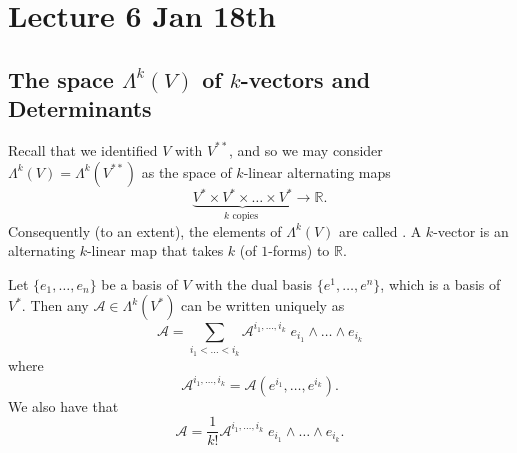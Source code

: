 \documentclass[notoc,notitlepage]{tufte-book}
\begin{document}



\chapter{Lecture 6 Jan 18th}%
\label{chp:lecture_6_jan_18th}

\section{The space \texorpdfstring{$\Lambda^k(V)$}{Lambda k(V)} of \texorpdfstring{$k$}{k}-vectors and Determinants}%
\label{sec:the_space_lambda_k_v_of_k_vectors_and_determinants}

Recall that we identified $V$ with $V^{**}$, and so we may consider
$\Lambda^k(V) = \Lambda^k(V^{**})$ as the space of $k$-linear alternating maps
\begin{equation*}
  \underbrace{V^* \times V^* \times \hdots \times V^*}_{k \text{ copies }} \to \mathbb{R}.
\end{equation*}
Consequently (to an extent), the elements of $\Lambda^k(V)$ are called .
A $k$-vector is an alternating $k$-linear map that takes $k$  (of $1$-forms)
to $\mathbb{R}$.

\begin{eg}
  Let $\{ e_1, \ldots, e_n \}$ be a basis of $V$ with the dual basis
  $\{ e^1, \ldots, e^n \}$, which is a basis of $V^*$. Then any
  $\mathcal{A} \in \Lambda^k(V^*)$ can be written uniquely as
  \begin{equation*}
    \mathcal{A} = \sum_{i_1 < \hdots < i_k} \mathcal{A}^{i_1, \ldots, i_k} \;
      e_{i_1} \land \hdots \land e_{i_k}
  \end{equation*}
  where
  \begin{equation*}
    \mathcal{A}^{i_1, \ldots, i_k} = \mathcal{A} \left( e^{i_1}, \ldots, e^{i_k} \right).
  \end{equation*}
  We also have that
  \begin{equation*}
    \mathcal{A} = \frac{1}{k!} \mathcal{A}^{i_1, \ldots, i_k} \; e_{i_1} \land \hdots \land e_{i_k}.
  \end{equation*}
\end{eg}
\end{document}
